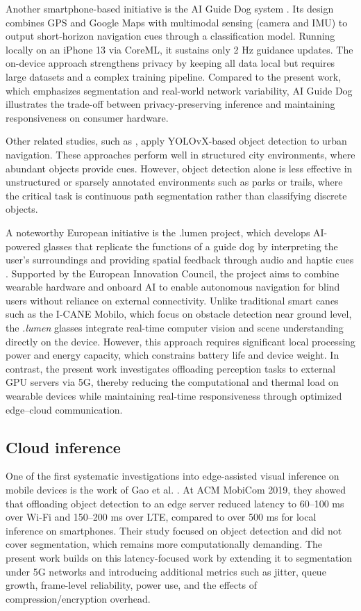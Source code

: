 \documentclass{ieeeaccess}
\begin{document}
Another smartphone-based initiative is the AI Guide Dog system \cite{chen2025aigd}. Its design combines GPS and Google Maps with multimodal sensing (camera and IMU) to output short-horizon navigation cues through a classification model. Running locally on an iPhone 13 via CoreML, it sustains only 2 Hz guidance updates. The on-device approach strengthens privacy by keeping all data local but requires large datasets and a complex training pipeline. Compared to the present work, which emphasizes segmentation and real-world network variability, AI Guide Dog illustrates the trade-off between privacy-preserving inference and maintaining responsiveness on consumer hardware.

Other related studies, such as \cite{khan2025enhancing,11156811}, apply YOLOvX-based object detection to urban navigation. These approaches perform well in structured city environments, where abundant objects provide cues. However, object detection alone is less effective in unstructured or sparsely annotated environments such as parks or trails, where the critical task is continuous path segmentation rather than classifying discrete objects.

A noteworthy European initiative is the \cite{dotlumen2025}{.lumen} project, which develops AI-powered glasses that replicate the functions of a guide dog by interpreting the user’s surroundings and providing spatial feedback through audio and haptic cues \cite{dotlumen2025}. Supported by the European Innovation Council, the project aims to combine wearable hardware and onboard AI to enable autonomous navigation for blind users without reliance on external connectivity. Unlike traditional smart canes such as the I-CANE Mobilo, which focus on obstacle detection near ground level, the \textit{.lumen} glasses integrate real-time computer vision and scene understanding directly on the device. However, this approach requires significant local processing power and energy capacity, which constrains battery life and device weight. In contrast, the present work investigates offloading perception tasks to external GPU servers via 5G, thereby reducing the computational and thermal load on wearable devices while maintaining real-time responsiveness through optimized edge–cloud communication.

\subsection{Cloud inference}

One of the first systematic investigations into edge-assisted visual inference on mobile devices is the work of Gao et al. \cite{gao2019edge}. At ACM MobiCom 2019, they showed that offloading object detection to an edge server reduced latency to 60–100 ms over Wi-Fi and 150–200 ms over LTE, compared to over 500 ms for local inference on smartphones. Their study focused on object detection and did not cover segmentation, which remains more computationally demanding. The present work builds on this latency-focused work by extending it to segmentation under 5G networks and introducing additional metrics such as jitter, queue growth, frame-level reliability, power use, and the effects of compression/encryption overhead.
\end{document}
